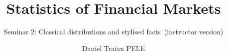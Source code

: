 \title[Statistics of Financial Markets]{Statistics of Financial Markets}
\subtitle{Seminar 2: Classical distributions and stylised facts\ifsolutions\ (instructor version)\fi}
\author[D.T. Pele]{Daniel Traian PELE}
\date{}

\providecommand{\sfmapplink}[3]{\hypertarget{#2}{}\hyperlink{#1}{\beamergotobutton{#3}}}  %
\providecommand{\sfmappback}[2]{\begin{tikzpicture}[remember picture,overlay]\node[anchor=south east] at ([xshift=-3mm,yshift=7mm]current page.south east){\hyperlink{#1}{\beamerreturnbutton{#2}}};\end{tikzpicture}}  %
\providecommand{\sfmchlink}[2]{\href{#1}{#2}}  %
\providecommand{\sfmchlinkt}[2]{\href{#1}{\usebeamercolor[fg]{frametitle}#2}}  %


